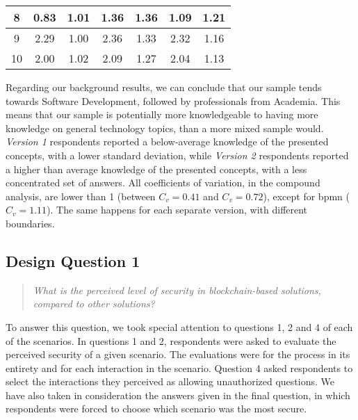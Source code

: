 \begin{table}[htb]
\begin{tabular}{c|cc|cc|cc}
		\hline
		8           & 0.83                              & 1.01                                     & 1.36                         & 1.36         & 1.09        & 1.21         \\
		\hline
		9           & 2.29                              & 1.00                                     & 2.36                         & 1.33         & 2.32        & 1.16         \\
		\hline
		10          & 2.00                              & 1.02                                     & 2.09                         & 1.27         & 2.04        & 1.13         \\
		\hline
	\end{tabular}
\end{table}

Regarding our background results, we can conclude that our sample tends towards Software Development, followed by professionals from Academia. This means that our sample is potentially more knowledgeable to having more knowledge on general technology topics, than a more mixed sample would. \textit{Version 1} respondents reported a below-average knowledge of the presented concepts, with a lower standard deviation, while \textit{Version 2} respondents reported a higher than average knowledge of the presented concepts, with a less concentrated set of answers. All coefficients of variation, in the compound analysis, are lower than 1 (between $C_v = 0.41$ and $C_v = 0.72$), except for \gls{bpmn} ($C_v = 1.11$). The same happens for each separate version, with different boundaries.

\subsection{Design Question 1}

\begin{quote}
	\textit{What is the perceived level of security in blockchain-based solutions, compared to other solutions?}
\end{quote}

To answer this question, we took special attention to questions 1, 2 and 4 of each of the scenarios. In questions 1 and 2, respondents were asked to evaluate the perceived security of a given scenario. The evaluations were for the process in its entirety and for each interaction in the scenario. Question 4 asked respondents to select the interactions they perceived as allowing unauthorized questions. We have also taken in consideration the answers given in the final question, in which respondents were forced to choose which scenario was the most secure.

